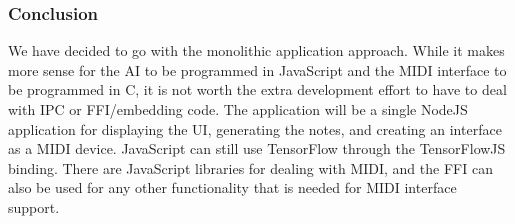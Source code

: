 \subsubsection{Conclusion}

We have decided to go with the monolithic application approach. While it makes more sense
for the AI to be programmed in JavaScript and the MIDI interface to be programmed in C, it
is not worth the extra development effort to have to deal with IPC or FFI/embedding code.
The application will be a single NodeJS application for displaying the UI, generating the
notes, and creating an interface as a MIDI device. JavaScript can still use TensorFlow
through the TensorFlowJS binding. There are JavaScript libraries for dealing with MIDI,
and the FFI can also be used for any other functionality that is needed for MIDI interface
support.
